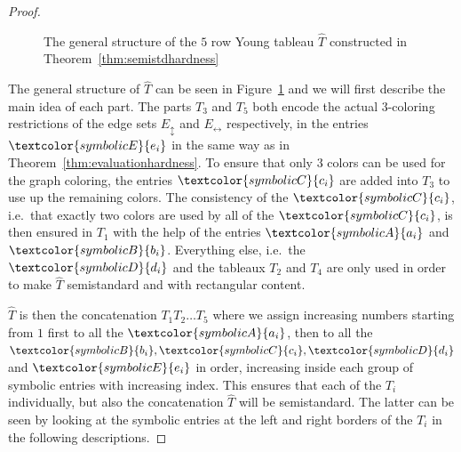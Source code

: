 \documentclass[10pt,a4paper]{article}
\numberwithin{equation}{section}
\theoremstyle{definition}
\newcommand{\Ehor}{{\ensuremath{E_{\leftrightarrow}}}}
\newcommand{\Evert}{{\ensuremath{E_{\updownarrow}}}}
\begin{document}
\begin{proof}
\begin{figure}[tpb]
        \caption{The general structure of the $5$ row Young tableau $\hat{T}$ constructed in Theorem~\ref{thm:semistdhardness}}
        \label{fig:semistdhardnesstructure}
    \end{figure}

    The general structure of $\hat{T}$ can be seen in Figure~\ref{fig:semistdhardnesstructure} and we will first describe the main idea of each part.
    The parts $T_3$ and $T_5$ both encode the actual $3$-coloring restrictions of the edge sets $\Evert$ and $\Ehor$ respectively, in the entries $\textcolor{symbolicE}{e_i}$ in the same way as in Theorem~\ref{thm:evaluationhardness}.
    To ensure that only $3$ colors can be used for the graph coloring, the entries $\textcolor{symbolicC}{c_i}$ are added into $T_3$ to use up the remaining colors.
    The consistency of the $\textcolor{symbolicC}{c_i}$, i.e.\ that exactly two colors are used by all of the $\textcolor{symbolicC}{c_i}$, is then ensured in $T_1$ with the help of the entries $\textcolor{symbolicA}{a_i}$ and $\textcolor{symbolicB}{b_i}$.
    Everything else, i.e.\ the $\textcolor{symbolicD}{d_i}$ and the tableaux $T_2$ and $T_4$ are only used in order to make $\hat{T}$ semistandard and with rectangular content.

    $\hat{T}$ is then the concatenation $T_1 T_2 \dots T_5$ where we assign increasing numbers starting from $1$ first to all the $\textcolor{symbolicA}{a_i}$, then to all the $\textcolor{symbolicB}{b_i}, \textcolor{symbolicC}{c_i}, \textcolor{symbolicD}{d_i}$ and $\textcolor{symbolicE}{e_i}$ in order, increasing inside each group of symbolic entries with increasing index.
    This ensures that each of the $T_i$ individually, but also the concatenation $\hat{T}$ will be semistandard.
    The latter can be seen by looking at the symbolic entries at the left and right borders of the $T_i$ in the following descriptions.


\end{proof}
\end{document}
